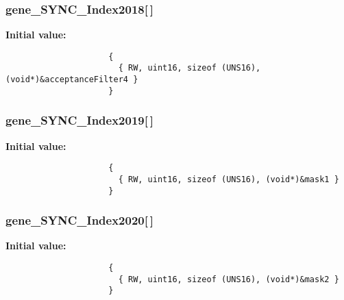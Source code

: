 \subsubsection{ {\bf gene\_\-SYNC\_\-Index2018}[$\,$]}\label{objdict_8c_b28636dcc351a0e1c52d33f2647da8e9}


\textbf{Initial value:}

\begin{Code}\begin{verbatim} 
                     {
                       { RW, uint16, sizeof (UNS16), (void*)&acceptanceFilter4 }
                     }
\end{verbatim}\end{Code}
\subsubsection{ {\bf gene\_\-SYNC\_\-Index2019}[$\,$]}\label{objdict_8c_555b2980ab97449c441233a626c28c15}


\textbf{Initial value:}

\begin{Code}\begin{verbatim} 
                     {
                       { RW, uint16, sizeof (UNS16), (void*)&mask1 }
                     }
\end{verbatim}\end{Code}
\subsubsection{ {\bf gene\_\-SYNC\_\-Index2020}[$\,$]}\label{objdict_8c_806b129e78ca1fff9e539786340b3624}


\textbf{Initial value:}

\begin{Code}\begin{verbatim} 
                     {
                       { RW, uint16, sizeof (UNS16), (void*)&mask2 }
                     }
\end{verbatim}\end{Code}

